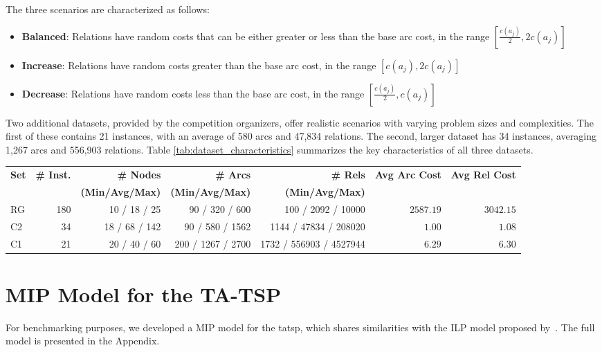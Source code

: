 \documentclass[twocolumn, switch]{article} %
\begin{document}
The three scenarios are characterized as follows:
\begin{itemize}
    \item \textbf{Balanced}: Relations have random costs that can be either greater or less than the base arc cost, in the range $[\frac{c(a_j)}{2}, 2c(a_j)]$
    \item \textbf{Increase}: Relations have random costs greater than the base arc cost, in the range $[c(a_j), 2c(a_j)]$
    \item \textbf{Decrease}: Relations have random costs less than the base arc cost, in the range $[\frac{c(a_j)}{2}, c(a_j)]$
\end{itemize}

Two additional datasets, provided by the competition organizers, offer realistic scenarios with varying problem sizes and complexities. The first of these contains 21 instances, with an average of 580 arcs and 47,834 relations. The second, larger dataset has 34 instances, averaging 1,267 arcs and 556,903 relations. Table \ref{tab:dataset_characteristics} summarizes the key characteristics of all three datasets.

\begin{table*}[t]
    \setlength{\belowcaptionskip}{8pt}
    \caption{Dataset Characteristics}
    \label{tab:dataset_characteristics}
    \centering
    \begin{tabular}{lrrrrrr}
        \toprule
        \textbf{Set} & \textbf{\# Inst.} & \textbf{\# Nodes} & \textbf{\# Arcs} & \textbf{\# Rels} & \textbf{Avg Arc Cost} & \textbf{Avg Rel Cost} \\
        & & \textbf{(Min/Avg/Max)} & \textbf{(Min/Avg/Max)} & \textbf{(Min/Avg/Max)} & & \\
        \midrule
        RG & 180 & 10 / 18 / 25 & 90 / 320 / 600 & 100 / 2092 / 10000 & $2587.19$ & $3042.15$ \\
        C2 & 34 & 18 / 68 / 142 & 90 / 580 / 1562 & 1144 / 47834 / 208020 & $1.00$ & $1.08$ \\
        C1 & 21 & 20 / 40 / 60 & 200 / 1267 / 2700 & 1732 / 556903 / 4527944 & $6.29$ & $6.30$ \\
        \bottomrule
    \end{tabular}
\end{table*}



\appendix
\section{MIP Model for the TA-TSP}
\label{sec:mip_model}
For benchmarking purposes, we developed a MIP model for the \gls{tatsp}, which shares similarities with the ILP model proposed by~\citet{Cerrone}.
The full model is presented in the Appendix.
\end{document}
